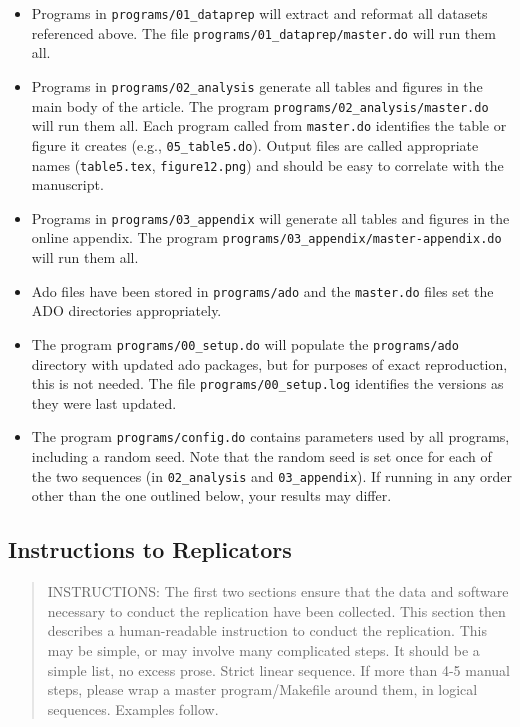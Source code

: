 \documentclass[
]{article}
\providecommand{\tightlist}{%
  \setlength{\itemsep}{0pt}\setlength{\parskip}{0pt}}
\begin{document}
\begin{itemize}
\tightlist
\item
  Programs in \texttt{programs/01\_dataprep} will extract and reformat
  all datasets referenced above. The file
  \texttt{programs/01\_dataprep/master.do} will run them all.
\item
  Programs in \texttt{programs/02\_analysis} generate all tables and
  figures in the main body of the article. The program
  \texttt{programs/02\_analysis/master.do} will run them all. Each
  program called from \texttt{master.do} identifies the table or figure
  it creates (e.g., \texttt{05\_table5.do}). Output files are called
  appropriate names (\texttt{table5.tex}, \texttt{figure12.png}) and
  should be easy to correlate with the manuscript.
\item
  Programs in \texttt{programs/03\_appendix} will generate all tables
  and figures in the online appendix. The program
  \texttt{programs/03\_appendix/master-appendix.do} will run them all.
\item
  Ado files have been stored in \texttt{programs/ado} and the
  \texttt{master.do} files set the ADO directories appropriately.
\item
  The program \texttt{programs/00\_setup.do} will populate the
  \texttt{programs/ado} directory with updated ado packages, but for
  purposes of exact reproduction, this is not needed. The file
  \texttt{programs/00\_setup.log} identifies the versions as they were
  last updated.
\item
  The program \texttt{programs/config.do} contains parameters used by
  all programs, including a random seed. Note that the random seed is
  set once for each of the two sequences (in \texttt{02\_analysis} and
  \texttt{03\_appendix}). If running in any order other than the one
  outlined below, your results may differ.
\end{itemize}

\hypertarget{instructions-to-replicators}{%
\subsection{Instructions to
Replicators}\label{instructions-to-replicators}}

\begin{quote}
INSTRUCTIONS: The first two sections ensure that the data and software
necessary to conduct the replication have been collected. This section
then describes a human-readable instruction to conduct the replication.
This may be simple, or may involve many complicated steps. It should be
a simple list, no excess prose. Strict linear sequence. If more than 4-5
manual steps, please wrap a master program/Makefile around them, in
logical sequences. Examples follow.
\end{quote}
\end{document}
